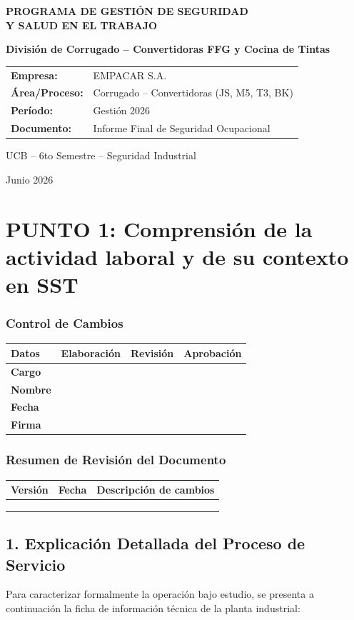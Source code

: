 \documentclass[11pt, letterpaper]{article}
\newcommand{\controlcambios}{
    \subsubsection*{Control de Cambios}
    \begin{table}[H]
        \centering
        \small
        \begin{tabular}{lp{4cm}p{4cm}p{4cm}}
            \toprule
            \textbf{Datos} & \textbf{Elaboración} & \textbf{Revisión} & \textbf{Aprobación} \\
            \midrule
            \textbf{Cargo} & & & \\
            \textbf{Nombre} & & & \\
            \textbf{Fecha} & & & \\
            \textbf{Firma} & & & \\
            \bottomrule
        \end{tabular}
    \end{table}
}
\newcommand{\resumenrevision}[1]{
    \subsubsection*{Resumen de Revisión del Documento}
    \begin{table}[H]
        \centering
        \small
        \begin{tabular}{ccp{8cm}}
            \toprule
            \textbf{Versión} & \textbf{Fecha} & \textbf{Descripción de cambios} \\
            \midrule
            #1 & & \\
            & & \\
            & & \\
            \bottomrule
        \end{tabular}
    \end{table}
}
\begin{document}
\begin{titlepage}
    \centering
    \vspace*{2cm}
    
    {\Huge\bfseries\color{empacarblue} PROGRAMA DE GESTIÓN DE SEGURIDAD\\Y SALUD EN EL TRABAJO\par}
    \vspace{1.5cm}
    {\Large\bfseries\color{darkgray} División de Corrugado -- Convertidoras FFG y Cocina de Tintas\par}
    
    \vspace{2.5cm}
    
    \begin{minipage}{0.8\textwidth}
        \centering
        \large
        \begin{tabular}{ll}
            \textbf{Empresa:} & EMPACAR S.A. \\
            \textbf{Área/Proceso:} & Corrugado -- Convertidoras (JS, M5, T3, BK) \\
            \textbf{Período:} & Gestión 2026 \\
            \textbf{Documento:} & Informe Final de Seguridad Ocupacional \\
        \end{tabular}
    \end{minipage}
    
    \vfill
    
    {\large\color{darkgray} UCB -- 6to Semestre -- Seguridad Industrial\par}
    {\large Junio 2026\par}
    
\end{titlepage}

\newpage
\tableofcontents
\newpage

\section{PUNTO 1: Comprensión de la actividad laboral y de su contexto en SST}
\controlcambios
\resumenrevision{}

\subsection{1. Explicación Detallada del Proceso de Servicio}
Para caracterizar formalmente la operación bajo estudio, se presenta a continuación la ficha de información técnica de la planta industrial:
\end{document}
